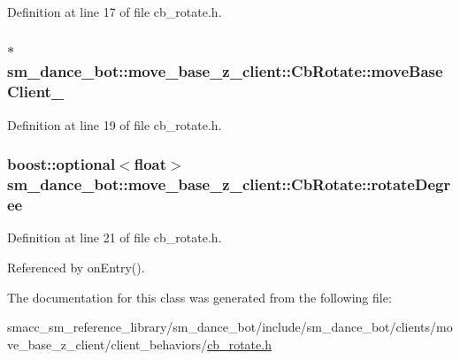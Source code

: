 Definition at line 17 of file cb\+\_\+rotate.\+h.

\subsubsection[{\texorpdfstring{move\+Base\+Client\+\_\+}{moveBaseClient_}}]{$\ast$ sm\+\_\+dance\+\_\+bot\+::move\+\_\+base\+\_\+z\+\_\+client\+::\+Cb\+Rotate\+::move\+Base\+Client\+\_\+}\hypertarget{classsm__dance__bot_1_1move__base__z__client_1_1CbRotate_acf8790630271d1180e2b9936edc4eb79}{}\label{classsm__dance__bot_1_1move__base__z__client_1_1CbRotate_acf8790630271d1180e2b9936edc4eb79}


Definition at line 19 of file cb\+\_\+rotate.\+h.

\subsubsection[{\texorpdfstring{rotate\+Degree}{rotateDegree}}]{\setlength{\rightskip}{0pt plus 5cm}boost\+::optional$<$float$>$ sm\+\_\+dance\+\_\+bot\+::move\+\_\+base\+\_\+z\+\_\+client\+::\+Cb\+Rotate\+::rotate\+Degree}\hypertarget{classsm__dance__bot_1_1move__base__z__client_1_1CbRotate_ab1ecbec2a3e65f6339d176f440e2e2f3}{}\label{classsm__dance__bot_1_1move__base__z__client_1_1CbRotate_ab1ecbec2a3e65f6339d176f440e2e2f3}


Definition at line 21 of file cb\+\_\+rotate.\+h.



Referenced by on\+Entry().



The documentation for this class was generated from the following file\+:\begin{DoxyCompactItemize}
\item 
smacc\+\_\+sm\+\_\+reference\+\_\+library/sm\+\_\+dance\+\_\+bot/include/sm\+\_\+dance\+\_\+bot/clients/move\+\_\+base\+\_\+z\+\_\+client/client\+\_\+behaviors/\hyperlink{smacc__sm__reference__library_2sm__dance__bot_2include_2sm__dance__bot_2clients_2move__base__z__5ee57f5e0712d66d82728a792a27d9fc}{cb\+\_\+rotate.\+h}\end{DoxyCompactItemize}
